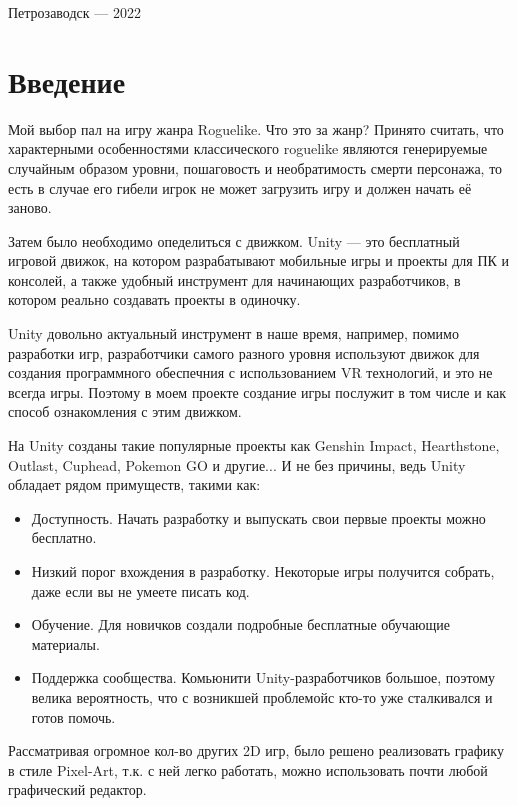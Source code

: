 \documentclass[a4paper,12pt]{article}
\begin{document}
\vfill

\begin{center}
\large
    Петрозаводск --- 2022
\end{center}




\newpage
\tableofcontents

\newpage
\section*{Введение}
\large {
Мой выбор пал на игру жанра Roguelike. Что это за жанр? Принято считать, что характерными особенностями классического roguelike являются генерируемые случайным образом уровни, пошаговость и необратимость смерти персонажа, то есть в случае его гибели игрок не может загрузить игру и должен начать её заново.

Затем было необходимо опеделиться с движком. Unity — это бесплатный игровой движок, на котором разрабатывают мобильные игры и проекты для ПК и консолей, а также удобный инструмент для начинающих разработчиков, в котором реально создавать проекты в одиночку. 

Unity довольно актуальный инструмент в наше время, например, помимо разработки игр, разработчики самого разного уровня используют движок для создания программного обеспечния с использованием VR технологий, и это не всегда игры. Поэтому в моем проекте создание игры послужит в том числе и как способ ознакомления с этим движком.

На Unity созданы такие популярные проекты как Genshin Impact, Hearthstone, Outlast, Cuphead, Pokemon GO и другие... И не без причины, ведь Unity обладает рядом примуществ, такими как:
\begin{itemize}
    \item Доступность. Начать разработку и выпускать свои первые проекты можно бесплатно.
    \item Низкий порог вхождения в разработку. Некоторые игры получится собрать, даже если вы не умеете писать код.
    \item Обучение. Для новичков создали подробные бесплатные обучающие материалы.
    \item Поддержка сообщества. Комьюнити Unity-разработчиков большое, поэтому велика вероятность, что с возникшей проблемойс кто-то уже сталкивался и готов помочь.
\end{itemize}

Рассматривая огромное кол-во других 2D игр, было решено реализовать графику в стиле Pixel-Art, т.к. с ней легко работать, можно использовать почти любой графический редактор.
}
\\ 
 \\
\end{document}

